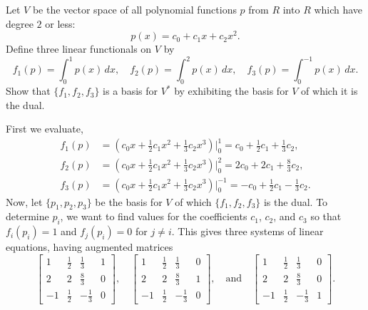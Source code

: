  Let $V$ be the vector space of all polynomial functions $p$
from $R$ into $R$ which have degree $2$ or less:
\begin{equation*}
  p(x) = c_0 + c_1x + c_2x^2.
\end{equation*}
Define three linear functionals on $V$ by
\begin{equation*}
  f_1(p) = \int_0^1p(x)\,dx, \quad
  f_2(p) = \int_0^2p(x)\,dx, \quad
  f_3(p) = \int_0^{-1}p(x)\,dx.
\end{equation*}
Show that $\{f_1,f_2,f_3\}$ is a basis for $V^*$ by exhibiting the
basis for $V$ of which it is the dual.
\begin{solution}
  First we evaluate,
  \begin{align*}
    f_1(p) &= \left(c_0x + \frac12c_1x^2 + \frac13c_2x^3\right)\Bigg|_0^1
    = c_0 + \frac12c_1 + \frac13c_2, \\
    f_2(p) &= \left(c_0x + \frac12c_1x^2 + \frac13c_2x^3\right)\Bigg|_0^2
    = 2c_0 + 2c_1 + \frac83c_2, \\
    f_3(p) &= \left(c_0x + \frac12c_1x^2 + \frac13c_2x^3\right)\Bigg|_0^{-1}
    = -c_0 + \frac12c_1 - \frac13c_2.
  \end{align*}
  Now, let $\{p_1,p_2,p_3\}$ be the basis for $V$ of which
  $\{f_1,f_2,f_3\}$ is the dual. To determine $p_i$, we want to find
  values for the coefficients $c_1$, $c_2$, and $c_3$ so that
  $f_i(p_i) = 1$ and $f_j(p_i) = 0$ for $j\neq i$. This gives three
  systems of linear equations, having augmented matrices
  \begin{equation*}
    \begin{bmatrix}
      1 & \frac12 & \frac13 & 1 \\[3pt]
      2 & 2 & \frac83 & 0 \\[3pt]
      -1 & \frac12 & -\frac13 & 0
    \end{bmatrix}, \quad
    \begin{bmatrix}
      1 & \frac12 & \frac13 & 0 \\[3pt]
      2 & 2 & \frac83 & 1 \\[3pt]
      -1 & \frac12 & -\frac13 & 0
    \end{bmatrix}, \quad\text{and}\quad
    \begin{bmatrix}
      1 & \frac12 & \frac13 & 0 \\[3pt]
      2 & 2 & \frac83 & 0 \\[3pt]
      -1 & \frac12 & -\frac13 & 1
    \end{bmatrix}.
  \end{equation*}

\end{solution}
